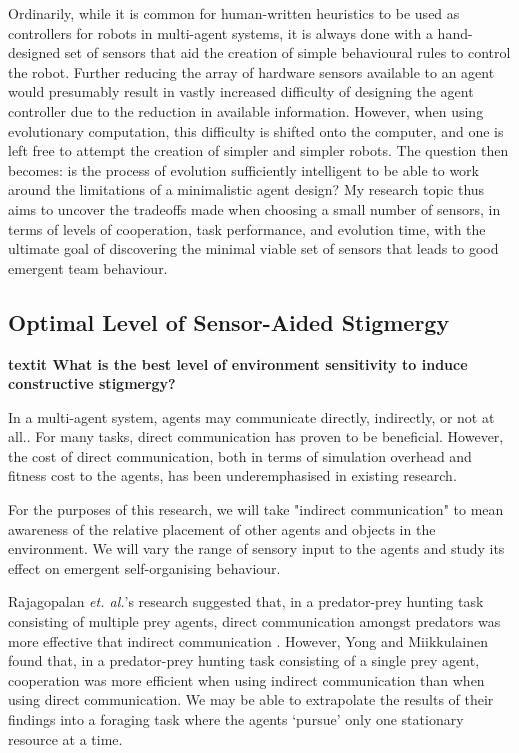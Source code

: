 \documentclass[a4paper,12pt]{article}
\begin{document}
Ordinarily, while it is common for human-written heuristics to be used as controllers for robots in multi-agent systems, it is always done with a hand-designed set of sensors that aid the creation of simple behavioural rules to control the robot\cite{Jones03}. Further reducing the array of hardware sensors available to an agent would presumably result in vastly increased difficulty of designing the agent controller due to the reduction in available information.
However, when using evolutionary computation, this difficulty is shifted onto the computer, and one is left free to attempt the creation of simpler and simpler robots. The question then becomes: is the process of evolution sufficiently intelligent to be able to work around the limitations of a minimalistic agent design? My research topic thus aims to uncover the tradeoffs made when choosing a small number of sensors, in terms of levels of cooperation, task performance, and evolution time, with the ultimate goal of discovering the minimal viable set of sensors that leads to good emergent team behaviour.

\subsection{Optimal Level of Sensor-Aided Stigmergy}


\textbf{ textit {What is the best level of environment sensitivity to induce constructive stigmergy?}}

In a multi-agent system, agents may communicate directly, indirectly, or not at all.\cite{Panait05}. For many tasks, direct communication has proven to be beneficial. However, the cost of direct communication, both in terms of simulation overhead and fitness cost to the agents, has been underemphasised in existing research\cite{Wagner00}.

For the purposes of this research, we will take "indirect communication" to mean awareness of the relative placement of other agents and objects in the environment. We will vary the range of sensory input to the agents and study its effect on emergent self-organising behaviour.

Rajagopalan \textit{et. al.}’s research suggested that, in a predator-prey hunting task consisting of multiple prey agents, direct communication amongst predators was more effective that indirect communication \cite{Rajagopalan11}. However, Yong and Miikkulainen found that, in a predator-prey hunting task consisting of a single prey agent, cooperation was more efficient when using indirect communication than when using direct communication.\cite{Yong09} We may be able to extrapolate the results of their findings into a foraging task where the agents ‘pursue’ only one stationary resource at a time.
\end{document}
